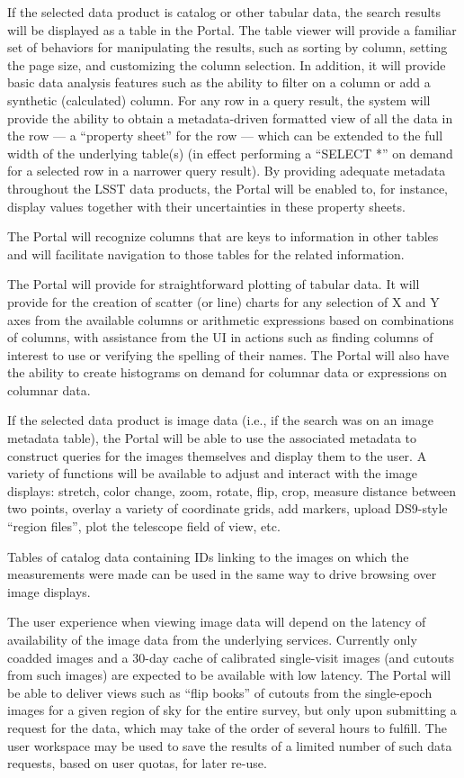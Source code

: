 If the selected data product is catalog or other tabular data, the search results will be displayed as a table in the Portal.
The table viewer will provide a familiar set of behaviors for manipulating the results, such as sorting by column, setting the page size, and customizing the column selection.
In addition, it will provide basic data analysis features such as the ability to filter on a column or add a synthetic (calculated) column.
For any row in a query result, the system will provide the ability to obtain a metadata-driven formatted view of all the data in the row --- a ``property sheet'' for the row --- which can be extended to the full width of the underlying table(s) (in effect performing a ``SELECT *'' on demand for a selected row in a narrower query result).
By providing adequate metadata throughout the LSST data products, the Portal will be enabled to, for instance, display values together with their uncertainties in these property sheets.

The Portal will recognize columns that are keys to information in other tables and will facilitate navigation to those tables for the related information.

The Portal will provide for straightforward plotting of tabular data.
It will provide for the creation of scatter (or line) charts for any selection of X and Y axes from the available columns or arithmetic expressions based on combinations of columns, with assistance from the UI in actions such as finding columns of interest to use or verifying the spelling of their names.
The Portal will also have the ability to create histograms on demand for columnar data or expressions on columnar data.

If the selected data product is image data (i.e., if the search was on an image metadata table), the Portal will be able to use the associated metadata to construct queries for the images themselves and display them to the user.
A variety of functions will be available to adjust and interact with the image displays: stretch, color change, zoom, rotate, flip, crop, measure distance between two points, overlay a variety of coordinate grids, add markers, upload DS9-style ``region files'', plot the telescope field of view, etc.

Tables of catalog data containing IDs linking to the images on which the measurements were made can be used in the same way to drive browsing over image displays.

The user experience when viewing image data will depend on the latency of availability of the image data from the underlying services.
Currently only coadded images and a 30-day cache of calibrated single-visit images (and cutouts from such images) are expected to be available with low latency.
The Portal will be able to deliver views such as ``flip books'' of cutouts from the single-epoch images for a given region of sky for the entire survey, but only upon submitting a request for the data, which may take of the order of several hours to fulfill.
The user workspace may be used to save the results of a limited number of such data requests, based on user quotas, for later re-use.

